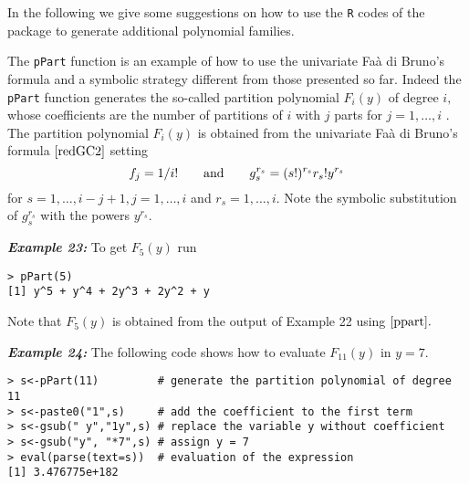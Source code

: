 In the following we give some suggestions on how to use the \texttt{R}
codes of the  package to generate additional
polynomial families.

The \texttt{pPart} function is an example of how to use the univariate
Faà di Bruno's formula and a symbolic strategy different from those
presented so far. Indeed the \texttt{pPart} function generates the
so-called partition polynomial \(F_i(y)\) of degree \(i,\) whose
coefficients are the number of partitions of \(i\) with \(j\) parts for
\(j=1, \ldots, i\) \citep{MR2427666}. The partition polynomial
\(F_i(y)\) is obtained from the univariate Faà di Bruno's formula
\(\eqref{redGC2}\) setting \begin{equation}
f_j = 1/i! \qquad \hbox{and} \qquad g_{s}^{r_s} =(s!)^{r_s} r_s! y^{r_s}
\label{ppart}
\end{equation} for \(s=1, \ldots, i-j+1, j=1,\ldots,i\) and
\(r_s=1, \ldots, i.\) Note the symbolic substitution of \(g_{s}^{r_s}\)
with the powers \(y^{r_s}.\)

\hskip-0.5cm\textbf{\emph{Example 23:}} To get \(F_5(y)\) run

\begin{verbatim}
> pPart(5)
[1] y^5 + y^4 + 2y^3 + 2y^2 + y
\end{verbatim}

\noindent Note that \(F_5(y)\) is obtained from the output of Example 22
using \(\eqref{ppart}.\)

\hskip-0.5cm\textbf{\emph{Example 24:}} The following code shows how to
evaluate \(F_{11}(y)\) in \(y=7.\)

\begin{verbatim}
> s<-pPart(11)         # generate the partition polynomial of degree 11
> s<-paste0("1",s)     # add the coefficient to the first term  
> s<-gsub(" y","1y",s) # replace the variable y without coefficient  
> s<-gsub("y", "*7",s) # assign y = 7
> eval(parse(text=s))  # evaluation of the expression
[1] 3.476775e+182
\end{verbatim}

